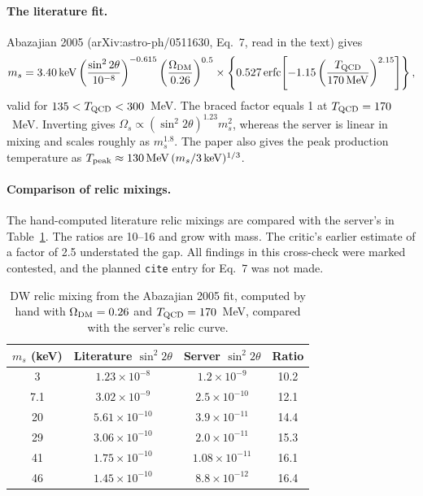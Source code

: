 \documentclass[11pt,a4paper]{article}
\begin{document}
\paragraph{The literature fit.} Abazajian 2005 (arXiv:astro-ph/0511630, Eq.~7, read in the text) gives
\[
m_s=3.40\,{\rm keV}\left(\frac{\sin^2 2\theta}{10^{-8}}\right)^{-0.615}\left(\frac{\Omega_{\rm DM}}{0.26}\right)^{0.5}\times\left\{0.527\,{\rm erfc}\!\left[-1.15\left(\frac{T_{\rm QCD}}{170\,{\rm MeV}}\right)^{2.15}\right]\right\},
\]
valid for $135<T_{\rm QCD}<300$~MeV. The braced factor equals 1 at $T_{\rm QCD} = 170$~MeV. Inverting gives $\Omega_s\propto(\sin^2 2\theta)^{1.23}m_s^2$, whereas the server is linear in mixing and scales roughly as $m_s^{1.8}$. The paper also gives the peak production temperature as $T_{\rm peak}\approx130\,{\rm MeV}\,(m_s/3\,{\rm keV})^{1/3}$.

\paragraph{Comparison of relic mixings.} The hand-computed literature relic mixings are compared with the server's in Table~\ref{tab:xcheck}. The ratios are 10--16 and grow with mass. The critic's earlier estimate of a factor of 2.5 understated the gap. All findings in this cross-check were marked contested, and the planned \texttt{cite} entry for Eq.~7 was not made.

\begin{table}
\centering
\begin{tabular}{cccc}
\toprule
$m_s$ (keV) & Literature $\sin^2 2\theta$ & Server $\sin^2 2\theta$ & Ratio \\
\midrule
3 & $1.23\times10^{-8}$ & $1.2\times10^{-9}$ & 10.2 \\
7.1 & $3.02\times10^{-9}$ & $2.5\times10^{-10}$ & 12.1 \\
20 & $5.61\times10^{-10}$ & $3.9\times10^{-11}$ & 14.4 \\
29 & $3.06\times10^{-10}$ & $2.0\times10^{-11}$ & 15.3 \\
41 & $1.75\times10^{-10}$ & $1.08\times10^{-11}$ & 16.1 \\
46 & $1.45\times10^{-10}$ & $8.8\times10^{-12}$ & 16.4 \\
\bottomrule
\end{tabular}
\caption{DW relic mixing from the Abazajian 2005 fit, computed by hand with $\Omega_{\rm DM}=0.26$ and $T_{\rm QCD}=170$~MeV, compared with the server's relic curve.}
\label{tab:xcheck}
\end{table}
\end{document}
